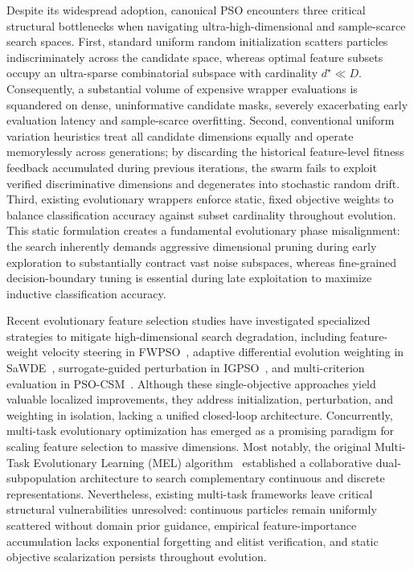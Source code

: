Despite its widespread adoption, canonical PSO encounters three critical structural bottlenecks when navigating ultra-high-dimensional and sample-scarce search spaces. First, standard uniform random initialization scatters particles indiscriminately across the candidate space, whereas optimal feature subsets occupy an ultra-sparse combinatorial subspace with cardinality $d^{\star} \ll D$. Consequently, a substantial volume of expensive wrapper evaluations is squandered on dense, uninformative candidate masks, severely exacerbating early evaluation latency and sample-scarce overfitting. Second, conventional uniform variation heuristics treat all candidate dimensions equally and operate memorylessly across generations; by discarding the historical feature-level fitness feedback accumulated during previous iterations, the swarm fails to exploit verified discriminative dimensions and degenerates into stochastic random drift. Third, existing evolutionary wrappers enforce static, fixed objective weights to balance classification accuracy against subset cardinality throughout evolution. This static formulation creates a fundamental evolutionary phase misalignment: the search inherently demands aggressive dimensional pruning during early exploration to substantially contract vast noise subspaces, whereas fine-grained decision-boundary tuning is essential during late exploitation to maximize inductive classification accuracy.

Recent evolutionary feature selection studies have investigated specialized strategies to mitigate high-dimensional search degradation, including feature-weight velocity steering in FWPSO~\cite{wangjia2022}, adaptive differential evolution weighting in SaWDE~\cite{wang2022}, surrogate-guided perturbation in IGPSO~\cite{xuezhang2024}, and multi-criterion evaluation in PSO-CSM~\cite{wei2025}. Although these single-objective approaches yield valuable localized improvements, they address initialization, perturbation, and weighting in isolation, lacking a unified closed-loop architecture. Concurrently, multi-task evolutionary optimization has emerged as a promising paradigm for scaling feature selection to massive dimensions. Most notably, the original Multi-Task Evolutionary Learning (MEL) algorithm~\cite{mel2024} established a collaborative dual-subpopulation architecture to search complementary continuous and discrete representations. Nevertheless, existing multi-task frameworks leave critical structural vulnerabilities unresolved: continuous particles remain uniformly scattered without domain prior guidance, empirical feature-importance accumulation lacks exponential forgetting and elitist verification, and static objective scalarization persists throughout evolution.

